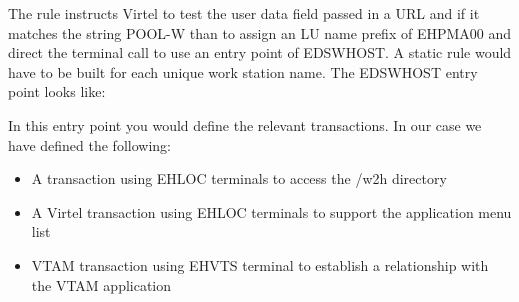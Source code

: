 \documentclass[letterpaper,10pt,english]{sphinxmanual}
\begin{document}
\begin{sphinxVerbatim}[commandchars=\\\{\}]
  
 
 
 
 
     
 
\end{sphinxVerbatim}


The rule instructs Virtel to test the user data field passed in a URL and if it matches the string POOL-W than to assign an LU name prefix of EHPMA00 and direct the terminal call to use an entry point of EDSWHOST. A static rule would have to be built for each unique work station name. The EDSWHOST entry point looks like:

\begin{sphinxVerbatim}[commandchars=\\\{\}]
  
 
 
 
 
 
 
 
 
\end{sphinxVerbatim}

In this entry point you would define the relevant transactions. In our case we have defined the following:
\begin{itemize}
\item {} 
A transaction using EHLOC terminals to access the /w2h directory

\item {} 
A Virtel transaction using EHLOC terminals to support the application menu list

\item {} 
VTAM transaction using EHVTS terminal to establish a relationship with the VTAM application

\end{itemize}
\end{document}

